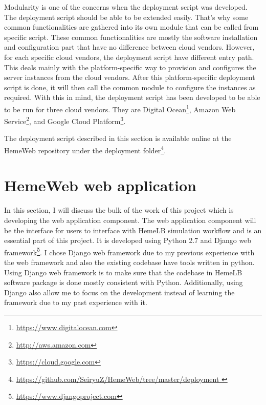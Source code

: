 Modularity is one of the concerns when the deployment script was developed. The deployment script should be able to be extended easily. That's why some common functionalities are gathered into its own module that can be called from specific script. These common functionalities are mostly the software installation and configuration part that have no difference between cloud vendors. However, for each specific cloud vendors, the deployment script have different entry path. This deals mainly with the platform-specific way to provision and configures the server instances from the cloud vendors. After this platform-specific deployment script is done, it will then call the common module to configure the instances as required. With this in mind, the deployment script has been developed to be able to be run for three cloud vendors. They are Digital Ocean\footnote{\url{https://www.digitalocean.com}}, Amazon Web Service\footnote{\url{http://aws.amazon.com}}, and Google Cloud Platform\footnote{\url{https://cloud.google.com}}.

The deployment script described in this section is available online at the HemeWeb repository under the deployment folder\footnote{\url{https://github.com/SeiryuZ/HemeWeb/tree/master/deployment }}.




\section{HemeWeb web application}

In this section, I will discuss the bulk of the work of this project which is developing the web application component. The web application component will be the interface for users to interface with HemeLB simulation workflow and is an essential part of this project. It is developed using Python 2.7 and Django web framework\footnote{\url{https://www.djangoproject.com}}. I chose Django web framework due to my previous experience with the web framework and also the existing codebase have tools written in python. Using Django web framework is to make sure that the codebase in HemeLB software package is done mostly consistent with Python. Additionally, using Django also allow me to focus on the development instead of learning the framework due to my past experience with it.



